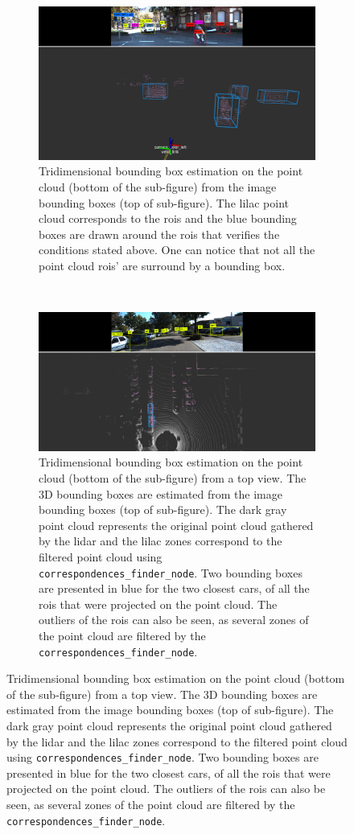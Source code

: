 \begin{figure}[ht!]\ContinuedFloat
	\centering	
	\begin{subfigure}[c]{0.8\textwidth}
		\includegraphics[width=\textwidth]{img/image-object-to-point-cloud/bboxes-front-view.png}
		\caption{Tridimensional bounding box estimation on the point cloud (bottom of the sub-figure) from the image bounding boxes (top of sub-figure). The lilac point cloud corresponds to the \acp{roi} and the blue bounding boxes are drawn around the \acp{roi} that verifies the conditions stated above. One can notice that not all the point cloud \acp{roi}' are surround by a bounding box.}
		\label{fig:bboxes-3d-kitti-front}
	\end{subfigure}
	\\ \vspace{4mm}
	\begin{subfigure}[c]{0.8\textwidth}
		\includegraphics[width=\textwidth]{img/image-object-to-point-cloud/bboxes-top-view.png}
		\caption{Tridimensional bounding box estimation on the point cloud (bottom of the sub-figure) from a top view. The 3D bounding boxes are estimated from the image bounding boxes (top of sub-figure). The dark gray point cloud represents the original point cloud gathered by the \ac{lidar} and the lilac zones correspond to the filtered point cloud using \texttt{correspondences\_finder\_node}. Two bounding boxes are presented in blue for the two closest cars, of all the \acp{roi} that were projected on the point cloud. The outliers of the \acp{roi} can also be seen, as several zones of the point cloud are filtered by the \texttt{correspondences\_finder\_node}.}

\end{subfigure}
\end{figure}

